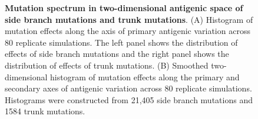 \documentclass[11pt,oneside,letterpaper]{article}
\begin{document}
\pagebreak

\vspace*{\fill}
\begin{figure}[H]
	\centering
	\caption{\textbf{Mutation spectrum in two-dimensional antigenic space of side branch mutations and trunk mutations}. (A) Histogram of mutation effects along the axis of primary antigenic variation across 80 replicate simulations.  The left panel shows the distribution of effects of side branch mutations and the right panel shows the distribution of effects of trunk mutations. (B) Smoothed two-dimensional histogram of mutation effects along the primary and secondary axes of antigenic variation across 80 replicate simulations.  Histograms were constructed from 21,405 side branch mutations and 1584 trunk mutations.}
	\label{mutspectrum}
\end{figure}
\vspace*{\fill}

\pagebreak
\end{document}

